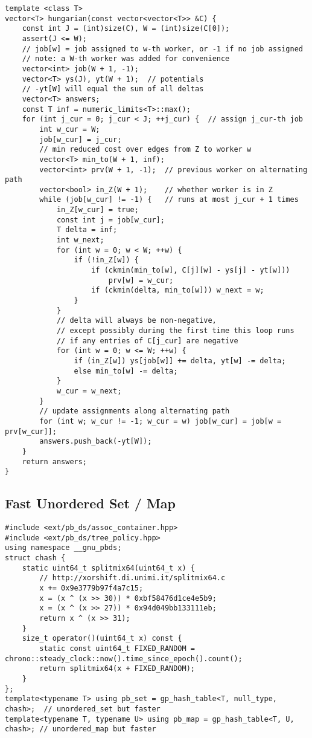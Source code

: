 \documentclass[8pt, headheight=10pt]{scrartcl}
\begin{document}
\begin{multicols*}{3}
\begin{lstlisting}
template <class T>
vector<T> hungarian(const vector<vector<T>> &C) {
    const int J = (int)size(C), W = (int)size(C[0]);
    assert(J <= W);
    // job[w] = job assigned to w-th worker, or -1 if no job assigned
    // note: a W-th worker was added for convenience
    vector<int> job(W + 1, -1);
    vector<T> ys(J), yt(W + 1);  // potentials
    // -yt[W] will equal the sum of all deltas
    vector<T> answers;
    const T inf = numeric_limits<T>::max();
    for (int j_cur = 0; j_cur < J; ++j_cur) {  // assign j_cur-th job
        int w_cur = W;
        job[w_cur] = j_cur;
        // min reduced cost over edges from Z to worker w
        vector<T> min_to(W + 1, inf);
        vector<int> prv(W + 1, -1);  // previous worker on alternating path
        vector<bool> in_Z(W + 1);    // whether worker is in Z
        while (job[w_cur] != -1) {   // runs at most j_cur + 1 times
            in_Z[w_cur] = true;
            const int j = job[w_cur];
            T delta = inf;
            int w_next;
            for (int w = 0; w < W; ++w) {
                if (!in_Z[w]) {
                    if (ckmin(min_to[w], C[j][w] - ys[j] - yt[w]))
                        prv[w] = w_cur;
                    if (ckmin(delta, min_to[w])) w_next = w;
                }
            }
            // delta will always be non-negative,
            // except possibly during the first time this loop runs
            // if any entries of C[j_cur] are negative
            for (int w = 0; w <= W; ++w) {
                if (in_Z[w]) ys[job[w]] += delta, yt[w] -= delta;
                else min_to[w] -= delta;
            }
            w_cur = w_next;
        }
        // update assignments along alternating path
        for (int w; w_cur != -1; w_cur = w) job[w_cur] = job[w = prv[w_cur]];
        answers.push_back(-yt[W]);
    }
    return answers;
}

\end{lstlisting}

\subsection{Fast Unordered Set / Map}
\begin{lstlisting}
#include <ext/pb_ds/assoc_container.hpp>
#include <ext/pb_ds/tree_policy.hpp>
using namespace __gnu_pbds;
struct chash {
    static uint64_t splitmix64(uint64_t x) {
        // http://xorshift.di.unimi.it/splitmix64.c
        x += 0x9e3779b97f4a7c15;
        x = (x ^ (x >> 30)) * 0xbf58476d1ce4e5b9;
        x = (x ^ (x >> 27)) * 0x94d049bb133111eb;
        return x ^ (x >> 31);
    }
    size_t operator()(uint64_t x) const {
        static const uint64_t FIXED_RANDOM = chrono::steady_clock::now().time_since_epoch().count();
        return splitmix64(x + FIXED_RANDOM);
    }
};
template<typename T> using pb_set = gp_hash_table<T, null_type, chash>;  // unordered_set but faster
template<typename T, typename U> using pb_map = gp_hash_table<T, U, chash>; // unordered_map but faster
\end{lstlisting}


\end{multicols*}
\end{document}
